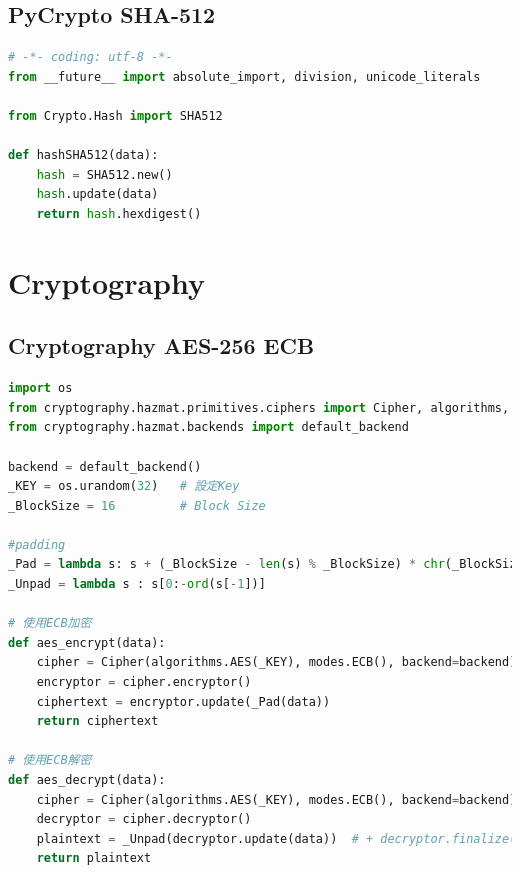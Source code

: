 \documentclass[12pt,a4paper]{article}
\begin{document}
\subsection{PyCrypto SHA-512}
{
\begin{lstlisting}[language=Python]
# -*- coding: utf-8 -*-
from __future__ import absolute_import, division, unicode_literals

from Crypto.Hash import SHA512

def hashSHA512(data):
    hash = SHA512.new()
    hash.update(data)
    return hash.hexdigest()
\end{lstlisting}
}

\newpage %
\section{Cryptography}

\subsection{Cryptography AES-256 ECB}
{
\begin{lstlisting}[language=Python]
import os
from cryptography.hazmat.primitives.ciphers import Cipher, algorithms, modes
from cryptography.hazmat.backends import default_backend

backend = default_backend()
_KEY = os.urandom(32)	# 設定Key
_BlockSize = 16	        # Block Size

#padding
_Pad = lambda s: s + (_BlockSize - len(s) % _BlockSize) * chr(_BlockSize - len(s) % _BlockSize)
_Unpad = lambda s : s[0:-ord(s[-1])]

# 使用ECB加密
def aes_encrypt(data):
    cipher = Cipher(algorithms.AES(_KEY), modes.ECB(), backend=backend)
    encryptor = cipher.encryptor()
    ciphertext = encryptor.update(_Pad(data))
    return ciphertext

# 使用ECB解密
def aes_decrypt(data):
    cipher = Cipher(algorithms.AES(_KEY), modes.ECB(), backend=backend)
    decryptor = cipher.decryptor()
    plaintext = _Unpad(decryptor.update(data))  # + decryptor.finalize()
    return plaintext
\end{lstlisting}
}
\end{document}
